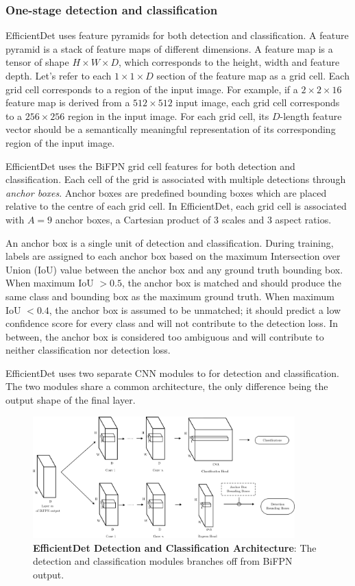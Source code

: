 \documentclass[12pt,a4paper,twoside,openright]{report}
\begin{document}
\subsubsection{One-stage detection and classification}
EfficientDet uses feature pyramids for both detection and classification. A feature pyramid is a stack of feature maps of different dimensions. A feature map is a tensor of shape $H \times W \times D$, which corresponds to the height, width and feature depth. Let's refer to each $1\times 1\times D$ section of the feature map as a grid cell. Each grid cell corresponds to a region of the input image. For example, if a $2\times 2 \times 16$ feature map is derived from a $512 \times 512$ input image, each grid cell corresponds to a $256 \times 256$ region in the input image. For each grid cell, its $D$-length feature vector should be a semantically meaningful representation of its corresponding region of the input image. 

EfficientDet uses the BiFPN grid cell features for both detection and classification. Each cell of the grid is associated with multiple detections through \textit{anchor boxes}. Anchor boxes are predefined bounding boxes which are placed relative to the centre of each grid cell. In EfficientDet, each grid cell is associated with $A=9$ anchor boxes, a Cartesian product of 3 scales and 3 aspect ratios. 

An anchor box is a single unit of detection and classification. During training, labels are assigned to each anchor box based on the maximum Intersection over Union (IoU) value between the anchor box and any ground truth bounding box. When maximum IoU $> 0.5$, the anchor box is matched and  should produce the same class and bounding box as the maximum ground truth. When maximum IoU $< 0.4$,  the anchor box is assumed to be unmatched; it should predict a low confidence score for every class and will not contribute to the detection loss. In between, the anchor box is considered too ambiguous and will contribute to neither classification nor detection loss.

EfficientDet uses two separate CNN modules to for detection and classification. The two modules share a common architecture, the only difference being the output shape of the final layer. 

\begin{figure}[h]
    \centering
    \includegraphics[width=0.9\textwidth]{figs/implementation/efficientdet_heads.png}
    \caption{\textbf{EfficientDet Detection and Classification Architecture}: The detection and classification modules branches off from BiFPN output.}
    \label{fig:edet_heads}
\end{figure}
\end{document}
